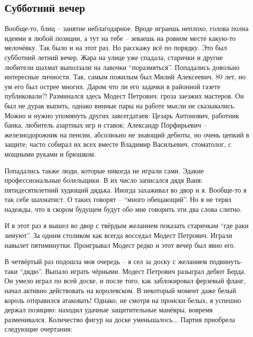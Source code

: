 \subsection*{Субботний вечер}
\markright{}

\begin{multicols}{2}[]
Вообще-то, блиц -- занятие неблагодарное. Вроде играешь неплохо, голова полна идеями в любой позиции, а тут на тебе -- зеваешь на ровном месте какую-то мелочёвку. Так было и на этот раз. Но расскажу всё по порядку. Это был субботний летний вечер. Жара на улице уже спадала, старички и другие любители шахмат выползали на лавочки ``поразмяться''. Попадались довольно интересные личности. Так, самым пожилым был Милий Алексеевич, 80 лет, но ум его был острее многих. Даром что ли его задачки в районной газете публиковали?! Разминался здесь Модест Петрович: гроза заезжих мастеров. Он был не дурак выпить, однако винные пары на работе мысли не сказывались. Можно и нужно упомянуть других завсегдатаев: Цезарь Антонович, работник банка, любитель азартных игр и ставок; Александр Порфирьевич -- железнодорожник на пенсии, абсолюьно не знающий дебюты, но очень цепкий в защите; часто собирал их всех вместе Владимир Васильевич, стоматолог, с мощными руками и брюшком.

Попадались также люди, которые никогда не играли сами. Эдакие профессиональные болельщики. В их число записался дядя Ваня: пятидесятилетний худющий дядька. Иногда захаживал во двор и я. Вообще-то я так себе шахматист. О таких говорят -- ``много обещающий''. Но я не терял надежды, что в скором будущем будут обо мне говорить эти два слова слитно.

И в этот раз я вышел во двор с твёрдым желанием показать старичкам ``где раки зимуют''. За одним столиком как всегда восседал Модест Петрович. Играли навылет пятиминутки. Проигрывал Модест редко и этот вечер был явно его. 

В четвёртый раз подошла моя очередь -- я сел за доску с желанием подвинуть-таки ``дядю''. Выпало играть чёрными. Модест Петрович разыграл дебют Берда. Он умело играл по всей доске, и после того, как заблокировал ферзевый фланг, начал активно действовать на королевском. В некоторый момент даже белый король отправился атаковать! Однако, не смотря на происки белых, я успешно держал позицию: находил удачные защитительные манёвры, вовремя разменивался. Количество фигур на доске уменьшалось... Партия приобрела следующие очертания:


\end{multicols}
